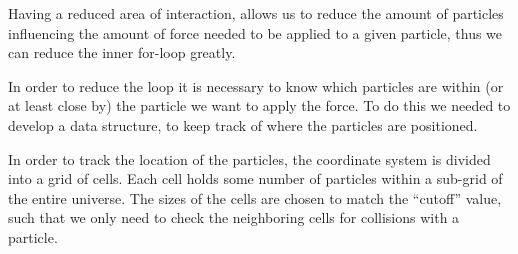 \documentclass[a4paper,11pt,oneside]{book}
\begin{document}
Having a reduced area of interaction, allows us to reduce the amount of particles influencing the amount of force needed
to be applied to a given particle, thus we can reduce the inner for-loop greatly.

In order to reduce the loop it is necessary to know which particles are within (or at least close by) the particle we
want to apply the force. To do this we needed to develop a data structure, to keep track of where the particles are
positioned.

In order to track the location of the particles, the coordinate system is divided into a grid of cells. Each cell holds
some number of particles within a sub-grid of the entire universe. The sizes of the cells are chosen to match the
``cutoff'' value, such that we only need to check the neighboring cells for collisions with a particle.
\end{document}
